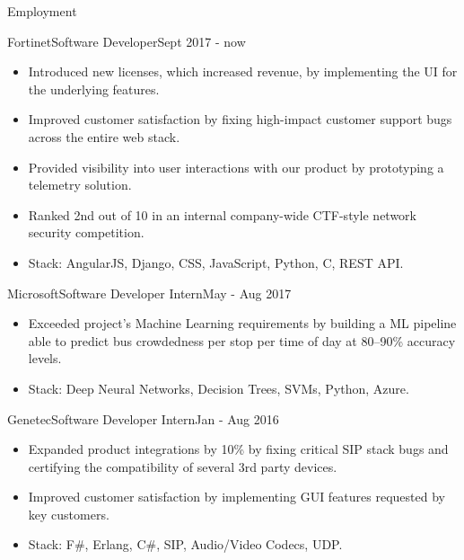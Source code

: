 \documentclass[]{muchicv}
\begin{document}
	\makeheader
	
	\begin{cvsection}{Employment}
		\begin{cvsubsection}{Fortinet}{Software Developer}{Sept 2017 - now}
			\begin{itemize}
				\item Introduced new licenses, which increased revenue, by implementing the UI for the underlying features.
				\item Improved customer satisfaction by fixing high-impact customer support bugs across the entire web stack.
				\item Provided visibility into user interactions with our product by prototyping a telemetry solution.
				\item Ranked 2nd out of 10 in an internal company-wide CTF-style network security competition.
				\item Stack: AngularJS, Django, CSS, JavaScript, Python, C, REST API.
			\end{itemize}
		\end{cvsubsection}
		
		\begin{cvsubsection}{Microsoft}{Software Developer Intern}{May - Aug 2017}
			\begin{itemize}
				\item Exceeded project's Machine Learning requirements by building a ML pipeline able to predict bus crowdedness per stop per time of day at 80--90\% accuracy levels.
				\item Stack: Deep Neural Networks, Decision Trees, SVMs, Python, Azure.
			\end{itemize}
		\end{cvsubsection}
		
		\begin{cvsubsection}{Genetec}{Software Developer Intern}{Jan - Aug 2016}
			\begin{itemize}
				\item Expanded product integrations by 10\% by fixing critical SIP stack bugs and certifying the compatibility of several 3rd party devices.
				\item Improved customer satisfaction by implementing GUI features requested by key customers.
				\item Stack: F\#, Erlang, C\#, SIP, Audio/Video Codecs, UDP.
			\end{itemize}
		\end{cvsubsection}


\end{cvsection}
\end{document}
